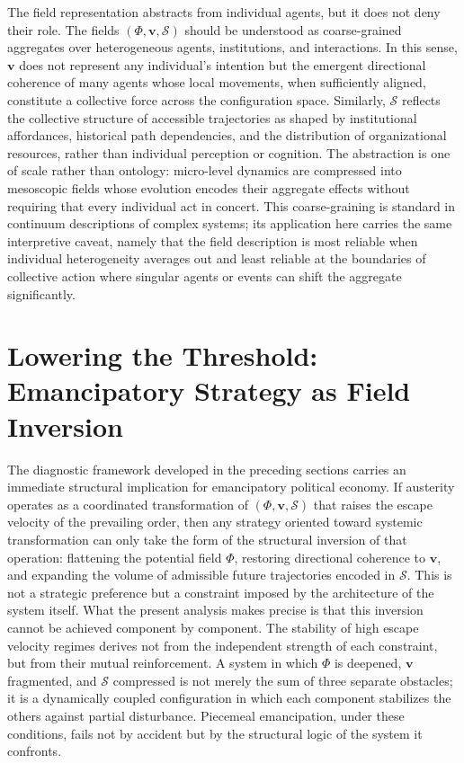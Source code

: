 \documentclass[11pt, a4paper]{article}
\begin{document}
The field representation abstracts from individual agents, but it does not deny their role. The fields $(\Phi, \mathbf{v}, \mathcal{S})$ should be understood as coarse-grained aggregates over heterogeneous agents, institutions, and interactions. In this sense, $\mathbf{v}$ does not represent any individual's intention but the emergent directional coherence of many agents whose local movements, when sufficiently aligned, constitute a collective force across the configuration space. Similarly, $\mathcal{S}$ reflects the collective structure of accessible trajectories as shaped by institutional affordances, historical path dependencies, and the distribution of organizational resources, rather than individual perception or cognition. The abstraction is one of scale rather than ontology: micro-level dynamics are compressed into mesoscopic fields whose evolution encodes their aggregate effects without requiring that every individual act in concert. This coarse-graining is standard in continuum descriptions of complex systems; its application here carries the same interpretive caveat, namely that the field description is most reliable when individual heterogeneity averages out and least reliable at the boundaries of collective action where singular agents or events can shift the aggregate significantly.


\section{Lowering the Threshold: Emancipatory Strategy as Field Inversion}

The diagnostic framework developed in the preceding sections carries an immediate structural implication for emancipatory political economy. If austerity operates as a coordinated transformation of $(\Phi, \mathbf{v}, \mathcal{S})$ that raises the escape velocity of the prevailing order, then any strategy oriented toward systemic transformation can only take the form of the structural inversion of that operation: flattening the potential field $\Phi$, restoring directional coherence to $\mathbf{v}$, and expanding the volume of admissible future trajectories encoded in $\mathcal{S}$. This is not a strategic preference but a constraint imposed by the architecture of the system itself. What the present analysis makes precise is that this inversion cannot be achieved component by component. The stability of high escape velocity regimes derives not from the independent strength of each constraint, but from their mutual reinforcement. A system in which $\Phi$ is deepened, $\mathbf{v}$ fragmented, and $\mathcal{S}$ compressed is not merely the sum of three separate obstacles; it is a dynamically coupled configuration in which each component stabilizes the others against partial disturbance. Piecemeal emancipation, under these conditions, fails not by accident but by the structural logic of the system it confronts.
\end{document}
